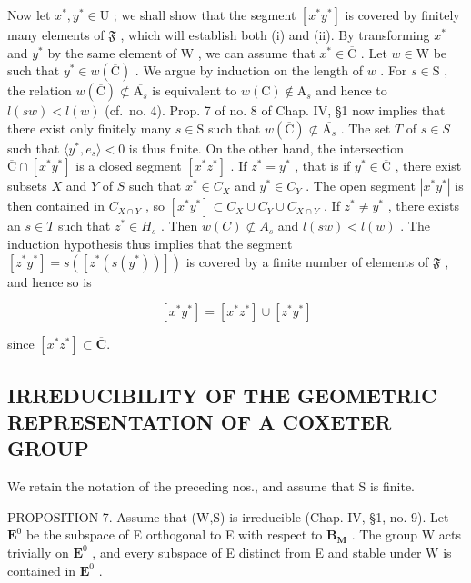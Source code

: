 Now let \(x^{*}, y^{*} \in \mathrm{U}\) ; we shall show that the segment \([x^{*}y^{*}]\) is covered by finitely many elements of \(\mathfrak{F}\) , which will establish both (i) and (ii). By transforming \(x^{*}\) and \(y^{*}\) by the same element of \(\mathrm{W}\) , we can assume that \(x^{*} \in \overline{\mathrm{C}}\) . Let \(w \in \mathrm{W}\) be such that \(y^{*} \in w(\overline{\mathrm{C}})\) . We argue by induction on the length of \(w\) . For \(s \in \mathrm{S}\) , the relation \(w(\overline{\mathrm{C}}) \not\subset \overline{\mathrm{A}_{s}}\) is equivalent to \(w(\mathrm{C}) \notin \mathrm{A}_{s}\) and hence to \(l(sw) < l(w)\) (cf.~no. 4). Prop. 7 of no. 8 of Chap. IV, §1 now implies that there exist only finitely many \(s \in \mathrm{S}\) such that \(w(\overline{\mathrm{C}}) \not\subset \overline{\mathrm{A}_{s}}\) . The set \(T\) of \(s \in S\) such that \(\langle y^{*}, e_{s} \rangle < 0\) is thus finite. On the other hand, the intersection \(\overline{\mathrm{C}} \cap [x^{*}y^{*}]\) is a closed segment \([x^{*}z^{*}]\) . If \(z^{*} = y^{*}\) , that is if \(y^{*} \in \overline{\mathrm{C}}\) , there exist subsets \(X\) and \(Y\) of \(S\) such that \(x^{*} \in C_{X}\) and \(y^{*} \in C_{Y}\) . The open segment \(|x^{*}y^{*}|\) is then contained in \(C_{X \cap Y}\) , so \([x^{*}y^{*}] \subset C_{X} \cup C_{Y} \cup C_{X \cap Y}\) . If \(z^{*} \neq y^{*}\) , there exists an \(s \in T\) such that \(z^{*} \in H_{s}\) . Then \(w(C) \not\subset A_{s}\) and \(l(sw) < l(w)\) . The induction hypothesis thus implies that the segment \([z^{*}y^{*}] = s([z^{*}(s(y^{*}))])\) is covered by a finite number of elements of \(\mathfrak{F}\) , and hence so is

\[
\left[ x ^ {*} y ^ {*} \right] = \left[ x ^ {*} z ^ {*} \right] \cup \left[ z ^ {*} y ^ {*} \right]
\]

since \([x^{*}z^{*}]\subset \overline{\mathbf{C}}.\)

\subsection{IRREDUCIBILITY OF THE GEOMETRIC REPRESENTATION OF A COXETER GROUP}

We retain the notation of the preceding nos., and assume that S is finite.

PROPOSITION 7. Assume that (W,S) is irreducible (Chap. IV, §1, no. 9). Let \(\mathbf{E}^0\) be the subspace of E orthogonal to E with respect to \(\mathbf{B}_{\mathbf{M}}\) . The group W acts trivially on \(\mathbf{E}^0\) , and every subspace of E distinct from E and stable under W is contained in \(\mathbf{E}^0\) .

